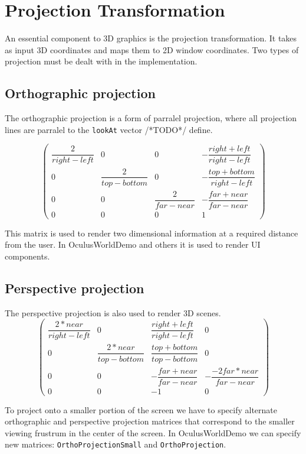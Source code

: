 \documentclass[12pt,a4paper,twoside,openright]{report}
\begin{document}
\section{Projection Transformation}

An essential component to 3D graphics is the projection transformation. It takes as input 3D coordinates and maps them to 2D window coordinates.
Two types of projection must be dealt with in the implementation. 

\subsection{Orthographic projection}
The orthographic projection is a form of parralel projection, where all projection lines are parralel to the \texttt{lookAt} vector /*TODO*/ define. 

\[
\begin{pmatrix}
\dfrac{2}{right-left} & 0 & 0 & -\dfrac{right+left}{right-left} \\
0 & \dfrac{2}{top-bottom} & 0 & -\dfrac{top+bottom}{right-left} \\
0 & 0 & \dfrac{2}{far-near} & -\dfrac{far + near}{far-near} \\
0 & 0 & 0 & 1
\end{pmatrix}
\]

This matrix is used to render two dimensional information at a required distance from the user. In OculusWorldDemo and others it is used to render UI components.
\subsection{Perspective projection}

The perspective projection is also used to render 3D scenes.
\[
\begin{pmatrix}
\dfrac{2*near}{right-left} & 0 & \dfrac{right + left}{right - left} & 0 \\
0 & \dfrac{2*near}{top-bottom} & \dfrac{top+bottom}{top-bottom} & 0 \\
0 & 0 & -\dfrac{far + near}{far-near} & -\dfrac{-2far*near}{far-near} \\
0 & 0 & -1 & 0
\end{pmatrix}
\]

To project onto a smaller portion of the screen we have to specify alternate orthographic and perspective projection matrices that correspond to the smaller viewing frustrum in the center of the screen. In OculusWorldDemo we can specify new matrices: \texttt{OrthoProjectionSmall} and \texttt{OrthoProjection}. 
\end{document}
